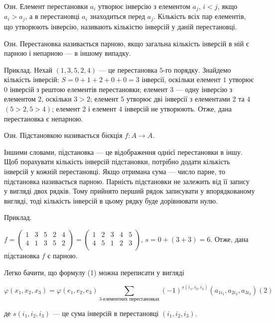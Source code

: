 Озн. Елемент перестановки $a_i$ утворює інверсію з елементом $a_j$, $i<j$, якщо
$a_i > a_j$, а в перестановці $a_i$ знаходиться перед $a_j$. Кількість всіх пар елементів, що
утворюють інверсію, називають кількістю інверсій у даній перестановці.



Озн. Перестановка називається парною, якщо загальна кількість інверсій в ній
є парною і непарною --- в іншому випадку.



Приклад. Нехай $(1,3,5,2,4)$ --- це перестановка $5$-го порядку. Знайдемо
кількість інверсій: $S = 0 + 1 + 2 + 0 + 0 = 3$ інверсії, оскільки елемент $1$ утворює $0$
інверсій з рештою елементів перестановки; елемент $3$ --- одну інверсію з елементом
$2$, оскільки $3 > 2$; елемент $5$ утворює дві інверсії з елементами $2$ та $4$ $(5>2,5>4)$;
елемент $2$ і елемент $4$ інверсій не утворюють. Отже, дана перестановка є
непарною.



Озн. Підстановкою називається бієкція $f: A \rightarrow A$.

Іншими словами, підстановка --- це відображення однієї перестановки в іншу.
Щоб порахувати кількість інверсій підстановки, потрібно додати кількість інверсій
у кожній перестановці. Якщо отримана сума --- число парне, то підстановка
називається парною. Парність підстановки не залежить від її запису у вигляді двох
рядків. Тому прийнято перший рядок записувати у впорядкованому вигляді, тоді
кількість інверсій в цьому рядку буде дорівнювати нулю.


Приклад.

$f = \begin{pmatrix}
	1 & 3 & 5 & 2 & 4 \\
	4 & 1 & 3 & 5 & 2 \\
\end{pmatrix} = \begin{pmatrix}
	1 & 2 & 3 & 4 & 5 \\
	4 & 5 & 1 & 2 & 3 \\
\end{pmatrix}$, $s = 0 + (3 + 3) = 6$. Отже,
дана підстановка $f$ є парною.

Легко бачити, що формулу (1) можна переписати у вигляді

$$\varphi(x_1, x_2, x_3) = \varphi(e_1, e_2, e_3)\sum\limits_{\text{3-елементних перестановках}} (-1)^{s(i_1, i_2, i_3)} (a_{1 i_1}, a_{2 i_2}, a_{3 i_3}) (2)$$


де $s(i_1, i_2, i_3)$ --- це сума інверсій в перестановці $(i_1, i_2, i_3)$. 



